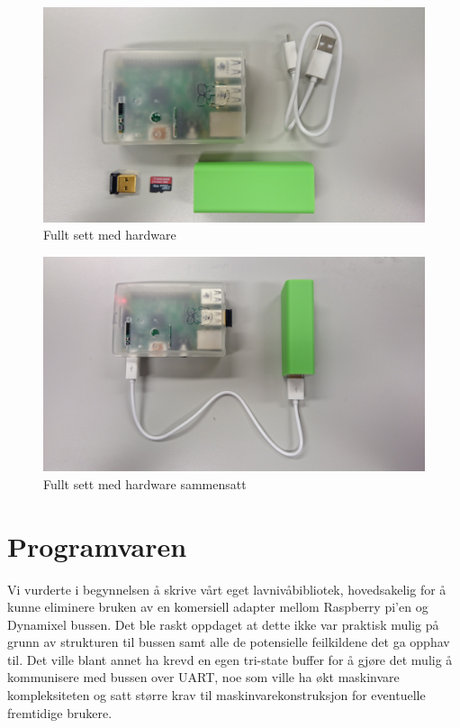 \documentclass[12pt]{report}
\begin{document}
\begin{figure}[H]
	\includegraphics[scale=0.07]{imgs/full_set}
	\centering
	\caption{Fullt sett med hardware}
	\label{fllsett}
\end{figure}

\begin{figure}[H]
	\includegraphics[scale=0.07]{imgs/assembled}
	\centering
	\caption{Fullt sett med hardware sammensatt}
	\label{fllsett}
\end{figure}

\section{Programvaren}
Vi vurderte i begynnelsen å skrive vårt eget lavnivåbibliotek, hovedsakelig for å kunne eliminere bruken av en komersiell adapter mellom Raspberry pi’en og Dynamixel bussen. Det ble raskt oppdaget at dette ikke var praktisk mulig på grunn av strukturen til bussen samt alle de potensielle feilkildene det ga opphav til. Det ville blant annet ha krevd en egen tri-state buffer for å gjøre det mulig å kommunisere med bussen over UART, noe som ville ha økt maskinvare kompleksiteten og satt større krav til maskinvarekonstruksjon for eventuelle fremtidige brukere.
\end{document}

